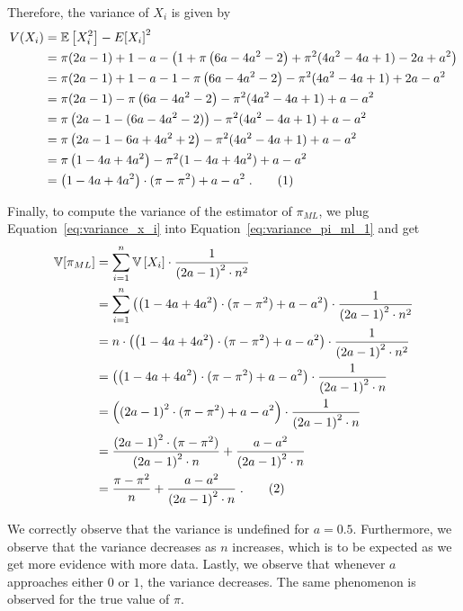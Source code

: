\documentclass{article}
\newcommand{\stepandtag}{%
  \refstepcounter{equation}%
  \tag{\theequation}%
}
\newcommand{\piml}{\ensuremath{\pi_{ML}}}
\begin{document}
Therefore, the variance of $X_i$ is given by
\begin{align*}
    V(X_i) &= \mathbb{E}\left[ X_i^2 \right] - {E[X_i]}^2 \\
    &= \pi (2a - 1) + 1 - a - \left( 1 + \pi \left(6a - 4a^2 - 2 \right) + \pi^2 (4 a^2 - 4 a + 1) - 2a + a^2 \right) \\
    &= \pi (2a - 1) + 1 - a -1 - \pi \left(6a - 4a^2 - 2 \right) - \pi^2 (4 a^2 - 4 a + 1) + 2a - a^2 \\
    &= \pi (2a - 1) - \pi \left(6a - 4a^2 - 2 \right) - \pi^2 (4 a^2 - 4 a + 1) + a - a^2 \\
    &= \pi \left(2a - 1 - (6a - 4a^2 - 2 )\right) - \pi^2 (4 a^2 - 4 a + 1) + a - a^2 \\
    &= \pi \left(2a - 1 - 6a + 4a^2 + 2 \right) - \pi^2 (4 a^2 - 4 a + 1) + a - a^2 \\
    &= \pi \left(1- 4a + 4a^2  \right) - \pi^2 (1 - 4a + 4 a^2) + a - a^2 \\
    &= \left(1- 4a + 4a^2  \right) \cdot (\pi - \pi^2) + a - a^2 \;. \stepandtag \label{eq:variance_x_i}
\end{align*}

Finally, to compute the variance of the estimator of $\piml$, we plug Equation~\ref{eq:variance_x_i} into Equation~\ref{eq:variance_pi_ml_1} and get
\begin{align*}
    \mathbb{V}[\pi_{ML}] &= \sum_{i=1}^{n} \mathbb{V}\left[  X_i \right] \cdot \frac{1}{{(2a-1)}^2 \cdot n^2} \\
    &= \sum_{i=1}^{n} \left( \left(1- 4a + 4a^2  \right) \cdot (\pi - \pi^2) + a - a^2 \right) \cdot \frac{1}{{(2a-1)}^2 \cdot n^2} \\
    &= n \cdot \left( \left(1- 4a + 4a^2  \right) \cdot (\pi - \pi^2) + a - a^2 \right) \cdot \frac{1}{{(2a-1)}^2 \cdot n^2} \\
    &= \left( \left(1- 4a + 4a^2  \right) \cdot (\pi - \pi^2) + a - a^2 \right) \cdot \frac{1}{{(2a-1)}^2 \cdot n} \\
    &= \left( {\left(2a -1 \right)}^2 \cdot (\pi - \pi^2) + a - a^2 \right) \cdot \frac{1}{{(2a-1)}^2 \cdot n} \\
    &= \frac{{\left(2a -1 \right)}^2 \cdot (\pi - \pi^2)}{{(2a-1)}^2 \cdot n} + \frac{a - a^2}{{(2a-1)}^2 \cdot n} \\
    &= \frac{\pi - \pi^2}{n} + \frac{a - a^2}{{(2a-1)}^2 \cdot n} \;. \stepandtag \label{eq:variance_pi_ml}
\end{align*}

We correctly observe that the variance is undefined for $a=0.5$. Furthermore, we observe that the variance decreases as $n$ increases, which is to be expected as we get more evidence with more data. 
Lastly, we observe that whenever $a$ approaches either $0$ or $1$, the variance decreases. The same phenomenon is observed for the true value of $\pi$. 
\end{document}
